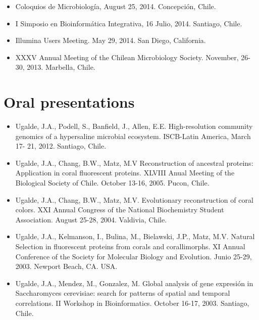 \documentclass[10pt,letterpaper]{article}
\begin{document}
\begin{itemize}

\item Coloquios de Microbiolog\'ia, August 25, 2014. Concepción, Chile.

\item I Simposio en Bioinform\'atica Integrativa, 16 Julio, 2014. Santiago, Chile.

\item Illumina Users Meeting. May 29, 2014. San Diego, California. 

\item XXXV Annual Meeting of the Chilean Microbiology Society. November, 26-30, 2013. Marbella, Chile.

\end{itemize}

 
\section*{Oral presentations}

\begin{itemize}
\item Ugalde, J.A., Podell, S., Banfield, J., Allen, E.E. High-resolution community genomics of a hypersaline microbial ecosystem. ISCB-Latin America, March 17- 21, 2012. Santiago, Chile.
\item Ugalde, J.A., Chang, B.W., Matz, M.V Reconstruction of ancestral proteins: Application in coral fluorescent proteins. XLVIII Anual Meeting of the Biological Society of Chile. October 13-16, 2005. Pucon, Chile.
\item Ugalde, J.A., Chang, B.W., Matz, M.V. Evolutionary reconstruction of coral colors. XXI Annual Congress of the National Biochemistry Student Association. August 25-28, 2004. Valdivia, Chile.
\item Ugalde, J.A., Kelmanson, I., Bulina, M., Bielawski, J.P., Matz, M.V. Natural Selection in fluorescent proteins from corals and corallimorphs. XI Annual Conference of the Society for Molecular Biology and Evolution. Junio 25-29, 2003. Newport Beach, CA. USA.
\item Ugalde, J.A., Mendez, M., Gonzalez, M. Global analysis of gene expresión in Saccharomyces cerevisiae: search for patterns of spatial and temporal correlations. II Workshop in Bioinformatics. October 16-17, 2003. Santiago, Chile.

\end{itemize}
\end{document}
